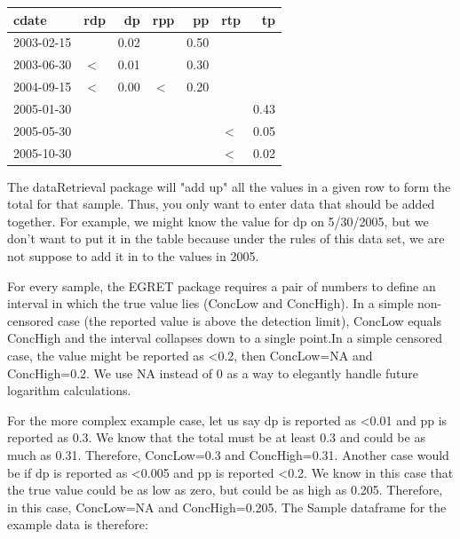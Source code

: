 \documentclass[a4paper,11pt]{article}
\begin{document}
\begin{center}

\begin{tabular}{llrlrlr}
  \hline
cdate & rdp & dp & rpp & pp & rtp & tp \\ 
  \hline
2003-02-15 &  & 0.02 &  & 0.50 &  &  \\ 
  2003-06-30 & $<$ & 0.01 &  & 0.30 &  &  \\ 
  2004-09-15 & $<$ & 0.00 & $<$ & 0.20 &  &  \\ 
  2005-01-30 &  &  &  &  &  & 0.43 \\ 
  2005-05-30 &  &  &  &  & $<$ & 0.05 \\ 
  2005-10-30 &  &  &  &  & $<$ & 0.02 \\ 
   \hline
\end{tabular}
\end{center}


The dataRetrieval package will "add up" all the values in a given row to form the total for that sample. Thus, you only want to enter data that should be added together. For example, we might know the value for dp on 5/30/2005, but we don't want to put it in the table because under the rules of this data set, we are not suppose to add it in to the values in 2005.

For every sample, the EGRET package requires a pair of numbers to define an interval in which the true value lies (ConcLow and ConcHigh). In a simple non-censored case (the reported value is above the detection limit), ConcLow equals ConcHigh and the interval collapses down to a single point.In a simple censored case, the value might be reported as <0.2, then ConcLow=NA and ConcHigh=0.2. We use NA instead of 0 as a way to elegantly handle future logarithm calculations.

For the more complex example case, let us say dp is reported as <0.01 and pp is reported as 0.3. We know that the total must be at least 0.3 and could be as much as 0.31. Therefore, ConcLow=0.3 and ConcHigh=0.31. Another case would be if dp is reported as <0.005 and pp is reported <0.2. We know in this case that the true value could be as low as zero, but could be as high as 0.205. Therefore, in this case, ConcLow=NA and ConcHigh=0.205. The Sample dataframe for the example data is therefore:
\end{document}
